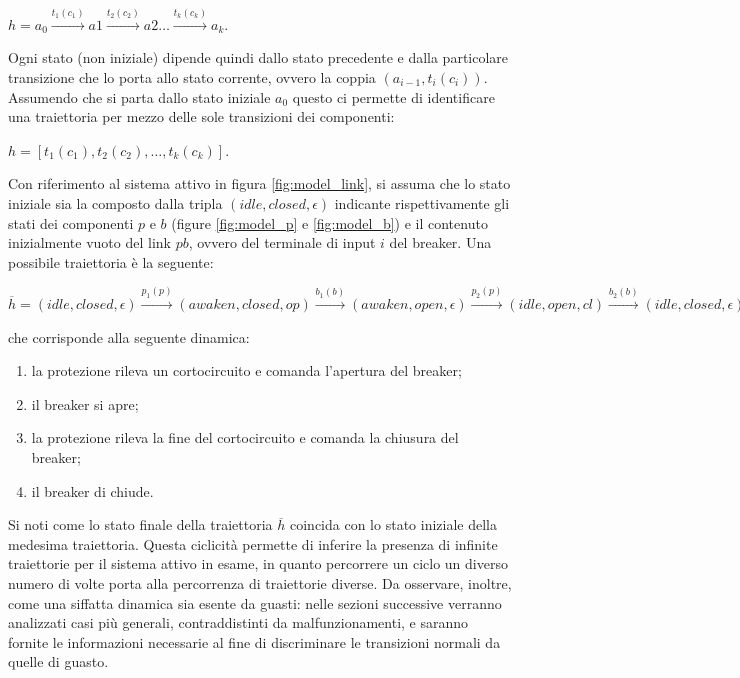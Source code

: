 \begin{center}
$h = a_0 \xrightarrow{t_1(c_1)} a1 \xrightarrow{t_2(c_2)} a2 \ldots \xrightarrow{t_k(c_k)} a_k$.
\end{center}
Ogni stato (non iniziale) dipende quindi dallo stato precedente e dalla particolare transizione che lo porta allo stato corrente, ovvero la coppia $(a_{i-1},t_i(c_i))$. Assumendo che si parta dallo stato iniziale $a_0$ questo ci permette di identificare una traiettoria per mezzo delle sole transizioni dei componenti:
\begin{center}
$h = [t_1(c_1),t_2(c_2), \ldots , t_k(c_k)]$.
\end{center}

\begin{ex} \label{ex:traiettoria}
Con riferimento al sistema attivo in figura \ref{fig:model_link}, si assuma che lo stato iniziale sia la composto dalla tripla $(idle,closed,\epsilon)$ indicante rispettivamente gli stati dei componenti $p$ e $b$ (figure \ref{fig:model_p} e \ref{fig:model_b}) e il contenuto inizialmente vuoto del link $pb$, ovvero del terminale di input $i$ del breaker. Una possibile traiettoria è la seguente:
\begin{center}
$\overline h = (idle,closed,\epsilon) \xrightarrow{p_1(p)} (awaken,closed,op) \xrightarrow{b_1(b)}(awaken,open,\epsilon) \xrightarrow{p_2(p)} (idle,open,cl) \xrightarrow{b_2(b)} (idle,closed,\epsilon)$
\end{center}
che corrisponde alla seguente dinamica:
\begin{enumerate}
\item la protezione rileva un cortocircuito e comanda l'apertura del breaker;
\item il breaker si apre;
\item la protezione rileva la fine del cortocircuito e comanda la chiusura del breaker;
\item il breaker di chiude.
\end{enumerate}
Si noti come lo stato finale della traiettoria $\overline{h}$ coincida con lo stato iniziale della medesima traiettoria. Questa ciclicità permette di inferire la presenza di infinite traiettorie per il sistema attivo in esame, in quanto percorrere un ciclo un diverso numero di volte porta alla percorrenza di traiettorie diverse.
Da osservare, inoltre, come una siffatta dinamica sia esente da guasti: nelle sezioni successive verranno analizzati casi più generali, contraddistinti da malfunzionamenti, e saranno fornite le informazioni necessarie al fine di discriminare le transizioni normali da quelle di guasto.
\end{ex}

